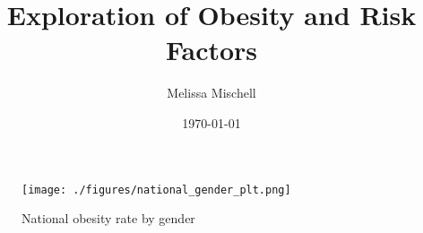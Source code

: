 \documentclass[11pt]{article}
\title{Exploration of Obesity and Risk Factors}
\author{Melissa Mischell}
\date{\today}
\begin{document}
\maketitle

\begin{figure}
\texttt{[image: ./figures/national\_gender\_plt.png]}
\caption{National obesity rate by gender}
\label{fig:gender}
\end{figure}
\end{document}
